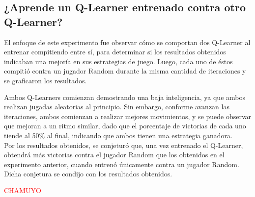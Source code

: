 \subsection{¿Aprende un Q-Learner entrenado contra otro Q-Learner?}

El enfoque de este experimento fue observar cómo se comportan dos Q-Learner al entrenar compitiendo entre sí, para determinar si los resultados obtenidos indicaban una mejoría en sus estrategias de juego.
Luego, cada uno de éstos compitió contra un jugador Random durante la misma cantidad de iteraciones y se graficaron los resultados.


Ambos Q-Learners comienzan demostrando una baja inteligencia, ya que ambos realizan jugadas aleatorias al principio. Sin embargo, conforme avanzan las iteraciones, ambos comienzan a realizar mejores movimientos, y se puede observar que mejoran a un ritmo similar, dado que el porcentaje de victorias de cada uno tiende al 50\% al final, indicando que ambos tienen una estrategia ganadora.\\

Por los resultados obtenidos, se conjeturó que, una vez entrenado el Q-Learner, obtendrá más victorias contra el jugador Random que los obtenidos en el experimento anterior, cuando entrenó únicamente contra un jugador Random.
Dicha conjetura se condijo con los resultados obtenidos.


\textcolor{red}{CHAMUYO}
